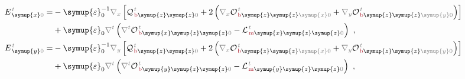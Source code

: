 \begin{subequations} \label{eq:E_0'}
\begin{align}
	E^{\;\!\mathcolor{gray}{t}}_{\;\! \symup{x}\mathcolor{gray}{0}} = &- {\symup{\varepsilon}}_0^{-1} \mathcolor{gray}{\nabla_x} \left[ {\mathcal{Q}}^{\;\!\mathcolor{gray}{t}}_{\;\!\textcolor{Maroon}{\text{b}}\symup{z} \symup{z} \mathcolor{gray}{0}} + 2 \left( \mathcolor{gray}{\nabla_x} {\mathcal{O}}^{\;\!\mathcolor{gray}{t}}_{\;\!\textcolor{Maroon}{\text{b}}\symup{z} \symup{z} \mathcolor{gray}{\symup{x}} \mathcolor{gray}{0}} + \mathcolor{gray}{\nabla_y}  {\mathcal{O}}^{\;\!\mathcolor{gray}{t}}_{\;\!\textcolor{Maroon}{\text{b}}\symup{z} \symup{z} \mathcolor{gray}{\symup{y}} \mathcolor{gray}{0}} \right) \right] \label{eq:E_x0'} \\ &+ {\symup{\varepsilon}}_0 \mathcolor{gray}{\nabla^t} \left( \mathcolor{gray}{\nabla^t} {\mathcal{O}}^{\;\!\mathcolor{gray}{t}}_{\;\!\textcolor{Maroon}{\text{b}}\symup{x} \symup{z} \symup{z} \mathcolor{gray}{0}} - {\mathcal{L}}^{\;\!\mathcolor{gray}{t}}_{\;\!\textcolor{Maroon}{\text{m}}\symup{x} \symup{z} \symup{z} \mathcolor{gray}{0}} \right) ~, \\ E^{\;\!\mathcolor{gray}{t}}_{\;\! \symup{y}\mathcolor{gray}{0}} = &- {\symup{\varepsilon}}_0^{-1} \mathcolor{gray}{\nabla_y} \left[ {\mathcal{Q}}^{\;\!\mathcolor{gray}{t}}_{\;\!\textcolor{Maroon}{\text{b}}\symup{z} \symup{z} \mathcolor{gray}{0}} + 2 \left( \mathcolor{gray}{\nabla_x} {\mathcal{O}}^{\;\!\mathcolor{gray}{t}}_{\;\!\textcolor{Maroon}{\text{b}}\symup{z} \symup{z} \mathcolor{gray}{\symup{x}} \mathcolor{gray}{0}} + \mathcolor{gray}{\nabla_y}  {\mathcal{O}}^{\;\!\mathcolor{gray}{t}}_{\;\!\textcolor{Maroon}{\text{b}}\symup{z} \symup{z} \mathcolor{gray}{\symup{y}} \mathcolor{gray}{0}} \right) \right] \label{eq:E_y0'} \\ &+ {\symup{\varepsilon}}_0 \mathcolor{gray}{\nabla^t} \left( \mathcolor{gray}{\nabla^t} {\mathcal{O}}^{\;\!\mathcolor{gray}{t}}_{\;\!\textcolor{Maroon}{\text{b}}\symup{y} \symup{z} \symup{z} \mathcolor{gray}{0}} - {\mathcal{L}}^{\;\!\mathcolor{gray}{t}}_{\;\!\textcolor{Maroon}{\text{m}}\symup{y} \symup{z} \symup{z} \mathcolor{gray}{0}} \right) ~, \\

\end{align}
\end{subequations}
